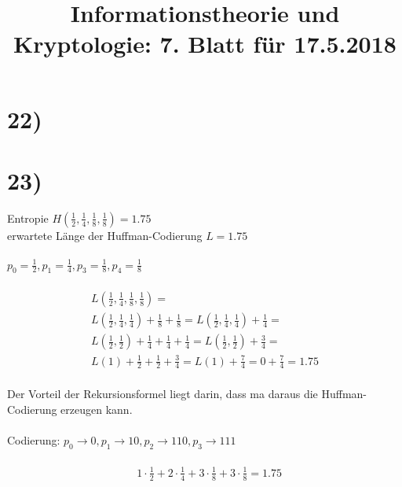 %



  \title{Informationstheorie und Kryptologie: 7. Blatt für 17.5.2018}
  \maketitle

  \section*{22)}

  

  \section*{23)}

  Entropie $H(\frac{1}{2}, \frac{1}{4}, \frac{1}{8}, \frac{1}{8}) = 1.75$\\
  erwartete Länge der Huffman-Codierung $L = 1.75$\\
  \\
  $p_0 = \frac{1}{2}, p_1 = \frac{1}{4}, p_3 = \frac{1}{8}, p_4 = \frac{1}{8}$\\
  \\
  \begin{align*}
    & L(\frac{1}{2}, \frac{1}{4}, \frac{1}{8}, \frac{1}{8}) = &\\
    & L(\frac{1}{2}, \frac{1}{4}, \frac{1}{4}) + \frac{1}{8} + \frac{1}{8} = L(\frac{1}{2}, \frac{1}{4}, \frac{1}{4}) + \frac{1}{4} =\\
    & L(\frac{1}{2}, \frac{1}{2}) + \frac{1}{4} + \frac{1}{4} + \frac{1}{4} = L(\frac{1}{2}, \frac{1}{2}) + \frac{3}{4} =\\
    & L(1) + \frac{1}{2} + \frac{1}{2} + \frac{3}{4} = L(1) + \frac{7}{4} = 0 + \frac{7}{4} = 1.75
  \end{align*}
  \\
  Der Vorteil der Rekursionsformel liegt darin, dass ma daraus die Huffman-Codierung erzeugen kann.\\
  \\
  Codierung: $p_0 \rightarrow 0, p_1 \rightarrow 10, p_2 \rightarrow 110, p_3 \rightarrow 111$\\
  \\
  \begin{align*}
    & 1 \cdot \frac{1}{2} + 2 \cdot \frac{1}{4} + 3 \cdot \frac{1}{8} + 3 \cdot \frac{1}{8} = 1.75
  \end{align*}

